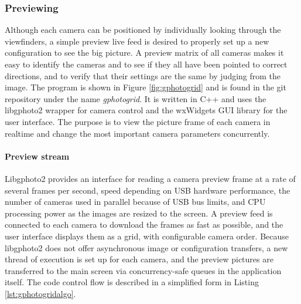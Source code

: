 
\subsubsection{Previewing} %



Although each camera can be positioned by individually looking through the viewfinders, a simple preview live feed is desired to properly set up a new configuration to see the big picture.
A preview matrix of all cameras makes it easy to identify the cameras and to see if they all have been pointed to correct directions, and to verify that their settings are the same by judging from the image.
The program is shown in Figure \ref{fig:gphotogrid} and is found in the git repository under the name \emph{gphotogrid}.
It is written in C++ and uses the libgphoto2 wrapper for camera control and the wxWidgets GUI library \cite{wxwidgets} for the user interface.
The purpose is to view the picture frame of each camera in realtime and change the most important camera parameters concurrently.

\paragraph{Preview stream}
Libgphoto2 provides an interface for reading a camera preview frame at a rate of several frames per second, speed depending on USB hardware performance, the number of cameras used in parallel because of USB bus limits, and CPU processing power as the images are resized to the screen.
A preview feed is connected to each camera to download the frames as fast as possible, and the user interface displays them as a grid, with configurable camera order.
Because libgphoto2 does not offer asynchronous image or configuration transfers, a new thread of execution is set up for each camera, and the preview pictures are transferred to the main screen via concurrency-safe queues in the application itself.
The code control flow is described in a simplified form in Listing \ref{lst:gphotogridalgo}.

